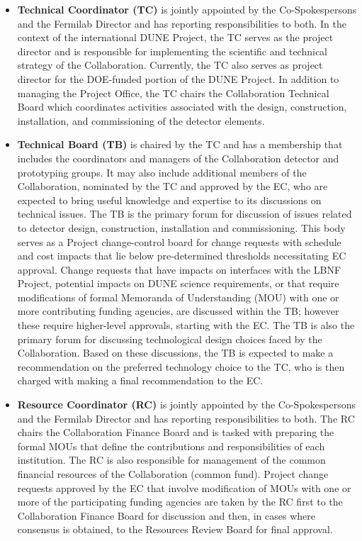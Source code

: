 \begin{itemize}
\item \textbf{Technical Coordinator (TC)} is jointly appointed by the Co-Spokespersons and the Fermilab Director and has reporting responsibilities to both.  In the context of the international DUNE Project, the TC serves as the project director 
and is responsible for implementing the scientific and technical strategy of the Collaboration.  Currently, the TC also serves as project director for the DOE-funded portion of the DUNE Project.  In addition to managing the Project Office, the TC chairs the Collaboration Technical Board which coordinates activities associated with the design, construction, installation, and commissioning of the %
detector elements.
\item \textbf{Technical Board (TB)} is chaired by the TC and has a membership that includes the coordinators and managers of the Collaboration detector and prototyping groups.  It may also include additional members of the Collaboration, nominated by the TC and approved by the EC, who are expected to bring useful knowledge and expertise to its discussions on technical issues.  The TB is the primary %
forum for discussion of issues related to %
detector design, construction, installation and commissioning. %
This body serves as a Project change-control board for change requests with schedule and cost impacts that lie below pre-determined thresholds necessitating EC approval.  Change requests that have impacts on interfaces with the LBNF Project, %
potential impacts on DUNE science requirements, or that require modifications of formal Memoranda of Understanding (MOU) with one or more 
contributing funding agencies, are discussed within the TB; however these require higher-level approvals, starting with the EC.  The TB is also the primary forum for discussing technological design choices faced by the Collaboration.  Based on these discussions, the TB is expected to make a recommendation on the preferred technology choice to the TC, who is then charged with making a final recommendation to the EC. 
\item \textbf{Resource Coordinator (RC)} is jointly appointed by the Co-Spokespersons and the Fermilab Director and has reporting responsibilities to both.  The RC chairs the Collaboration Finance Board and is tasked with preparing the formal MOUs that define the contributions and responsibilities of each institution.  The RC is also responsible for management of the common financial resources of the Collaboration (common fund).  Project change requests approved by the EC that involve modification of MOUs with one or more of the participating funding agencies are taken by the RC first to the Collaboration Finance Board for discussion and then, in cases where consensus is obtained, to the Resources Review Board for final approval.

\end{itemize}
